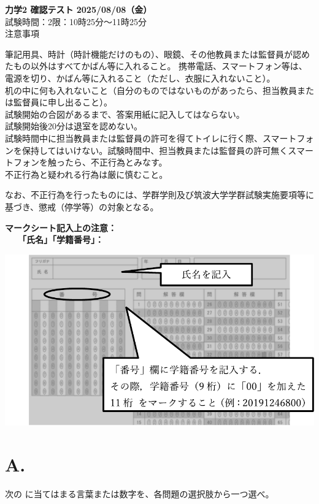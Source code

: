 \documentclass[a4paper,14Q]{ltjsarticle}
\newcommand{\longMK}[1]{\setlength{\fboxrule}{0.8pt}\fboxsep2pt\framebox{\hspace*{0.3\zw}#1\hspace{0.3\zw}}}
\begin{document}
\noindent
{\Large\bfseries 力学2 確認テスト 2025/08/08（金）}\\[1.5\zh]
{\Large\sffamily\gtfamily 試験時間：\quad2限：10時25分\quad 〜\quad 11時25分\\[3\zh]
注意事項}\bigskip

\noindent{}\zw
{}筆記用具、時計（時計機能だけのもの）、眼鏡、その他教員または監督員が認めたもの以外はすべてかばん等に入れること。
携帯電話、スマートフォン等は、電源を切り、かばん等に入れること（ただし、衣服に入れないこと）。\\
机の中に何も入れないこと（自分のものではないものがあったら、担当教員または監督員に申し出ること）。\\
試験開始の合図があるまで、答案用紙に記入してはならない。\\
試験開始後20分は退室を認めない。\\
試験時間中に担当教員または監督員の許可を得てトイレに行く際、スマートフォンを保持してはいけない。試験時間中、担当教員または監督員の許可無くスマートフォンを触ったら、不正行為とみなす。\\
不正行為と疑われる行為は厳に慎むこと。
\par
なお、不正行為を行ったものには、学群学則及び筑波大学学群試験実施要項等に基づき、懲戒（停学等）の対象となる。
\vspace{2\zh}

\noindent{}\zw
{\large\bfseries マークシート記入上の注意：\\
　　「氏名」「学籍番号」：}
\begin{center}
  \includegraphics{hyo4fig.pdf}
\end{center}

\newpage
\section*{A.}\noindent
次の \longMK{空欄} に当てはまる言葉または数字を、各問題の選択肢から一つ選べ。
\bigskip
\end{document}
